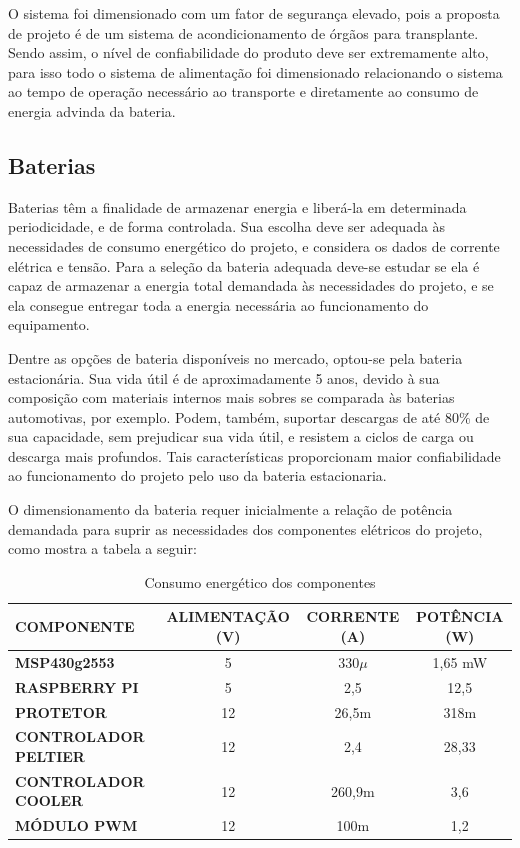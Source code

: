 O sistema foi dimensionado com um fator de segurança elevado, pois a proposta de projeto é de um sistema de acondicionamento de órgãos para transplante. Sendo assim, o nível de confiabilidade do produto deve ser extremamente alto, para isso todo o sistema de alimentação foi dimensionado relacionando o sistema ao tempo de operação necessário ao transporte e diretamente ao consumo de energia advinda da bateria.

\subsection{Baterias}
Baterias têm a finalidade de armazenar energia e liberá-la em determinada periodicidade, e de forma controlada. Sua escolha deve ser adequada às necessidades de consumo energético do projeto, e considera os dados de corrente elétrica e tensão. Para a seleção da bateria adequada deve-se estudar se ela é capaz de armazenar a energia total demandada às necessidades do projeto, e se ela consegue entregar toda a energia necessária ao funcionamento do equipamento.

Dentre as opções de bateria disponíveis no mercado, optou-se pela bateria estacionária. Sua vida útil é de aproximadamente 5 anos, devido à sua composição com materiais internos mais sobres se comparada às baterias automotivas, por exemplo. Podem, também, suportar descargas de até 80\% de sua capacidade, sem prejudicar sua vida útil, e resistem a ciclos de carga ou descarga mais profundos. Tais características proporcionam maior confiabilidade ao funcionamento do projeto pelo uso da bateria estacionaria.

O dimensionamento da bateria requer inicialmente a relação de potência demandada para suprir as necessidades dos componentes elétricos do projeto, como mostra a tabela a seguir:

\begin{table}[H]
\caption{Consumo energético dos componentes}
\begin{tabular}{|p{4 cm} |c |c |c |}
 \hline
   \textbf{COMPONENTE} &\textbf{ALIMENTAÇÃO (V)}  &\textbf{CORRENTE (A)} & \textbf{POTÊNCIA (W)} \\
   \hline
  \textbf{MSP430g2553} &5 & 330$\mu$& 1,65 mW \\
   \hline
   \textbf{RASPBERRY PI}&5 &2,5 & 12,5 \\
   \hline
  \textbf{PROTETOR } &12 &26,5m &318m \\
   \hline
  \textbf{CONTROLADOR PELTIER} &12 & 2,4& 28,33 \\
   \hline
  \textbf{CONTROLADOR COOLER} &12 &260,9m &3,6  \\
   \hline
  \textbf{MÓDULO PWM} &12 &100m & 1,2 \\
   \hline
\end{tabular}
\end{table}


